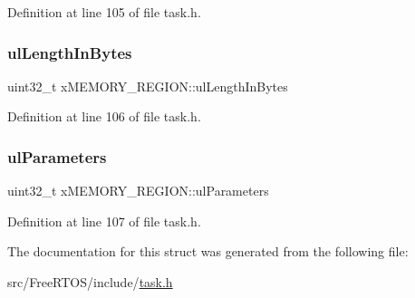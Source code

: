 Definition at line 105 of file task.\+h.

\mbox{\label{structx_m_e_m_o_r_y___r_e_g_i_o_n_a97e59578d3c4c46270d33e7206258a65}} 
\subsubsection{\texorpdfstring{ul\+Length\+In\+Bytes}{ulLengthInBytes}}
{\footnotesize\ttfamily uint32\+\_\+t x\+M\+E\+M\+O\+R\+Y\+\_\+\+R\+E\+G\+I\+O\+N\+::ul\+Length\+In\+Bytes}



Definition at line 106 of file task.\+h.

\mbox{\label{structx_m_e_m_o_r_y___r_e_g_i_o_n_a6ba180553e9a318f23acc5f4664934e3}} 
\subsubsection{\texorpdfstring{ul\+Parameters}{ulParameters}}
{\footnotesize\ttfamily uint32\+\_\+t x\+M\+E\+M\+O\+R\+Y\+\_\+\+R\+E\+G\+I\+O\+N\+::ul\+Parameters}



Definition at line 107 of file task.\+h.



The documentation for this struct was generated from the following file\+:\begin{DoxyCompactItemize}
\item 
src/\+Free\+R\+T\+O\+S/include/\hyperlink{task_8h}{task.\+h}\end{DoxyCompactItemize}
